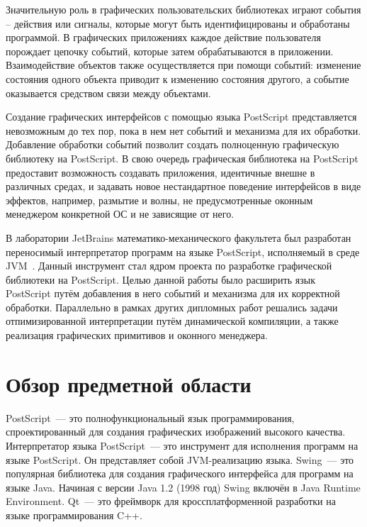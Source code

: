 Значительную роль в графических пользовательских библиотеках играют события --  действия или сигналы, которые могут быть идентифицированы и обработаны программой. В графических приложениях каждое действие пользователя порождает цепочку событий, которые затем обрабатываются в приложении. Взаимодействие объектов также осуществляется при помощи событий: изменение состояния одного объекта приводит к изменению состояния другого, а событие оказывается средством связи между объектами. 

Создание графических интерфейсов с помощью языка PostScript представляется невозможным до тех пор, пока в нем нет событий и механизма для их обработки. Добавление обработки событий позволит создать полноценную графическую библиотеку на PostScript. В свою очередь графическая библиотека на PostScript предоставит возможность создавать приложения, идентичные внешне в различных средах, и задавать новое нестандартное поведение интерфейсов в виде эффектов, например, размытие и волны, не предусмотренные оконным менеджером конкретной ОС и не зависящие от него.

В лаборатории JetBrains математико-механического факультета  был разработан переносимый интерпретатор программ на языке PostScript, исполняемый в среде JVM~\cite{wiki:makulov, wiki:pozdin, wiki:gudiev}. Данный инструмент стал ядром проекта по разработке графической библиотеки на  PostScript. Целью данной работы было расширить язык PostScript путём добавления в него событий и механизма для их корректной обработки. Параллельно в рамках других дипломных работ решались задачи отпимизированной интерпретации путём динамической компиляции, а также реализация графических примитивов и оконного менеджера.

 
\section{Обзор предметной области}

PostScript~--- это полнофункциональный язык программирования, спроектированный для создания графических изображений высокого качества. %
Интерпретатор языка PostScript~--- это инструмент для исполнения программ на языке PostScript. Он представляет собой JVM-реализацию языка. Swing~--- это популярная библиотека для создания графического интерфейса для программ на языке Java. Начиная с версии Java 1.2 (1998 год) Swing включён в Java Runtime Environment. Qt~--- это фреймворк для кроссплатформенной разработки на языке программирования C++. 

